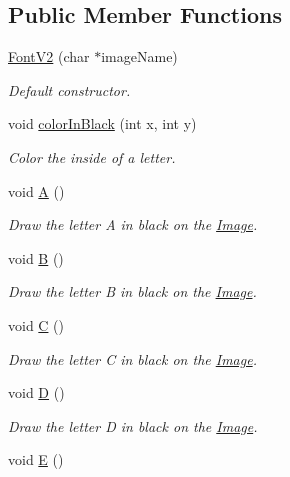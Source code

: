 \subsection*{Public Member Functions}
\begin{DoxyCompactItemize}
\item 
\mbox{\hyperlink{class_font_v2_aecf9c03af709aa99c23f5c785e798ef4}{Font\+V2}} (char $\ast$image\+Name)
\begin{DoxyCompactList}\small\item\em Default constructor. \end{DoxyCompactList}\item 
void \mbox{\hyperlink{class_font_v2_a04f2501961bc286ce70fbb6a840b0e8a}{color\+In\+Black}} (int x, int y)
\begin{DoxyCompactList}\small\item\em Color the inside of a letter. \end{DoxyCompactList}\item 
void \mbox{\hyperlink{class_font_v2_ae1a96e014f4cc9e4447b0a2d947f4a33}{A}} ()
\begin{DoxyCompactList}\small\item\em Draw the letter A in black on the \mbox{\hyperlink{class_image}{Image}}. \end{DoxyCompactList}\item 
void \mbox{\hyperlink{class_font_v2_a0a895c96067874028864303ab64ce889}{B}} ()
\begin{DoxyCompactList}\small\item\em Draw the letter B in black on the \mbox{\hyperlink{class_image}{Image}}. \end{DoxyCompactList}\item 
void \mbox{\hyperlink{class_font_v2_ab7dc3a07d1442bd391513c4c202f2a43}{C}} ()
\begin{DoxyCompactList}\small\item\em Draw the letter C in black on the \mbox{\hyperlink{class_image}{Image}}. \end{DoxyCompactList}\item 
void \mbox{\hyperlink{class_font_v2_ab6a088abff91bacc1096b6008296142b}{D}} ()
\begin{DoxyCompactList}\small\item\em Draw the letter D in black on the \mbox{\hyperlink{class_image}{Image}}. \end{DoxyCompactList}\item 
void \mbox{\hyperlink{class_font_v2_a3dc7a171c913a94b688689c69abafeca}{E}} ()

\end{DoxyCompactItemize}
